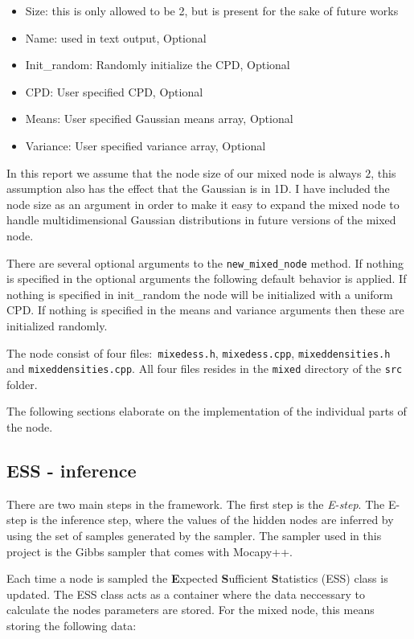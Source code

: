 \documentclass[10pt, journal, compsocconf,a4paper]{IEEEtran}
\begin{document}
\begin{itemize}
  \item Size: this is only allowed to be 2, but is present for the sake of future works
  \item Name: used in text output, Optional
  \item Init\_random: Randomly initialize the CPD, Optional
  \item CPD: User specified CPD, Optional
  \item Means: User specified Gaussian means array, Optional
  \item Variance: User specified variance array, Optional
\end{itemize}

In this report we assume that the node size of our mixed node is always $2$, this assumption also has the effect that the Gaussian is in 1D. I have included the node size as an argument in order to make it easy to expand the mixed node to handle multidimensional Gaussian distributions in future versions of the mixed node. 

There are several optional arguments to the \texttt{new\_mixed\_node} method. If nothing is specified in the optional arguments the following default behavior is applied. If nothing is specified in init\_random the node will be initialized with a uniform CPD. If nothing is specified in the means and variance arguments then these are initialized randomly.

The node consist of four files:\texttt{ mixedess.h}, \texttt{mixedess.cpp}, \texttt{mixeddensities.h} and \texttt{mixeddensities.cpp}. All four files resides in the \texttt{mixed} directory of the \texttt{src} folder.

The following sections elaborate on the implementation of the individual parts of the node.


\subsection{ESS - inference} %
\label{sub:ess}
There are two main steps in the framework. The first step is the \emph{E-step}. The E-step is the inference step, where the values of the hidden nodes are inferred by using the set of samples generated by the sampler. The sampler used in this project is the Gibbs sampler that comes with Mocapy++.

Each time a node is sampled the \textbf{E}xpected \textbf{S}ufficient \textbf{S}tatistics (ESS) class is updated. The ESS class acts as a container where the data neccessary to calculate the nodes parameters are stored. For the mixed node, this means storing the following data:
\end{document}
